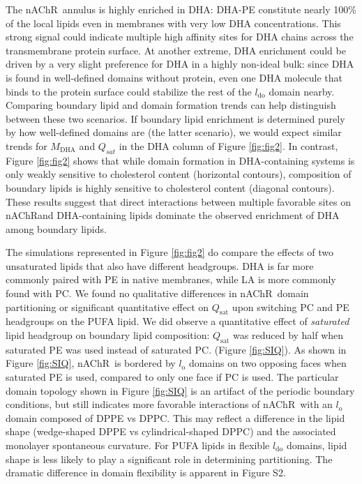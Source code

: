\documentclass[final,3p,times,twocolumn]{elsarticle}
\newcommand{\qsat}{Q_{\mathrm{sat}}}
\newcommand{\lo}{l_{\mathrm{o}}}
\newcommand{\ldo}{l_{\mathrm{do}}}
\newcommand{\mself}[1]{M_{\mathrm{#1}}}
\newcommand{\nachr}{nAChR}
\begin{document}
	The \nachr~annulus is highly enriched in DHA: DHA-PE constitute nearly 100\% of the local lipids even in membranes with very low DHA concentrations. This strong signal could indicate multiple high affinity sites for DHA chains across the transmembrane protein surface. At another extreme, DHA enrichment could be driven by a very slight preference for DHA in a highly non-ideal bulk: since DHA is found in well-defined domains without protein, even one DHA molecule that binds to the protein surface could stabilize the rest of the $\ldo$ domain nearby. Comparing boundary lipid and domain formation trends can help distinguish between these two scenarios.  If boundary lipid enrichment is determined purely by how well-defined domains are (the latter scenario), we would expect similar trends for $\mself{DHA}$ and $Q_{sat}$ in the DHA column of Figure \ref{fig:fig2}.  In contrast,  Figure \ref{fig:fig2} shows that while domain formation in DHA-containing systems is only weakly sensitive to cholesterol content (horizontal contours), composition of boundary lipids is highly sensitive to cholesterol content (diagonal contours). These results suggest that direct interactions between multiple favorable sites on \nachr and DHA-containing lipids dominate the observed enrichment of DHA among boundary lipids.  
	
	The simulations represented in Figure \ref{fig:fig2} do compare the effects of two unsaturated lipids that also have different headgroups. DHA is far more commonly paired with PE in native membranes, while LA is more commonly found with PC. We found no qualitative differences in \nachr~domain partitioning or significant quantitative effect on $\qsat$ upon switching PC and PE headgroups on the PUFA lipid.  We did observe a quantitative effect of \emph{saturated} lipid headgroup on boundary lipid composition: $\qsat$ was reduced by half when saturated PE was used instead of saturated PC. (Figure \ref{fig:SIQ}).  As shown in Figure \ref{fig:SIQ}, \nachr~is bordered by $\lo$ domains on two opposing faces when saturated PE is used, compared to only one face if PC is used.  
The particular domain topology shown in Figure \ref{fig:SIQ} is an artifact of the periodic boundary conditions, but still indicates more favorable interactions of \nachr~with an $\lo$ domain composed of DPPE vs DPPC. This may reflect a difference in the lipid shape (wedge-shaped DPPE vs cylindrical-shaped DPPC) and the associated monolayer spontaneous curvature.  For PUFA lipids in flexible $\ldo$ domains, lipid shape is less likely to play a significant role in determining partitioning. The dramatic difference in domain flexibility is apparent in  Figure S2.   
	
\end{document}
